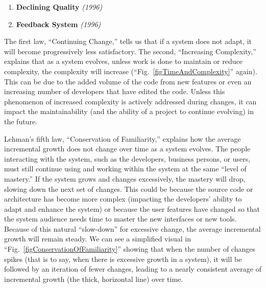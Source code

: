 \documentclass[12pt,conference]{IEEEtran}
\begin{document}
\begin{enumerate}
    \item \textbf{Declining Quality} \textit{(1996)}

    \item \textbf{Feedback System} \textit{(1996)}
\end{enumerate}

\vspace{0.25cm}

The first law, ``Continuing Change,'' tells us that if a system does not adapt, it will become progressively less satisfactory. The second, ``Increasing Complexity,'' explains that as a system evolves, unless work is done to maintain or reduce complexity, the complexity will increase (``Fig.~\ref{figTimeAndComplexity}'' again). This can be due to the added volume of the code from new features or even an increasing number of developers that have edited the code. Unless this phenomenon of increased complexity is actively addressed during changes, it can impact the maintainability (and the ability of a project to continue evolving) in the future.

Lehman's fifth law, ``Conservation of Familiarity,'' explains how the average incremental growth does not change over time as a system evolves. The people interacting with the system, such as the developers, business persons, or users, must still continue using and working within the system at the same ``level of mastery.'' If the system grows and changes excessively, the mastery will drop, slowing down the next set of changes. This could be because the source code or architecture has become more complex (impacting the developers' ability to adapt and enhance the system) or because the user features have changed so that the system audience needs time to master the new interfaces or new tools. Because of this natural ``slow-down'' for excessive change, the average incremental growth will remain steady. We can see a simplified visual in ``Fig.~\ref{figConservationOfFamiliarity}'' showing that when the number of changes spikes (that is to say, when there is excessive growth in a system), it will be followed by an iteration of fewer changes, leading to a nearly consistent average of incremental growth (the thick, horizontal line) over time.
\end{document}
